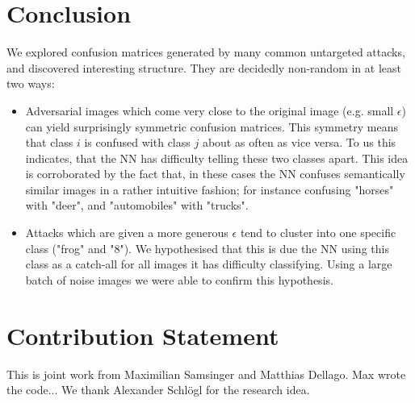 \documentclass{article}
\begin{document}
\section{Conclusion}
We explored confusion matrices generated by many common untargeted attacks, and discovered interesting structure.
They are decidedly non-random in at least two ways:
\begin{itemize}
	\item Adversarial images which come very close to the original image (e.g. small $\epsilon$) can yield surprisingly symmetric confusion matrices. This symmetry means that class $i$ is confused with class $j$ about as often as vice versa. To us this indicates, that the NN has difficulty telling these two classes apart. This idea is corroborated by the fact that, in these cases the NN confuses semantically similar images in a rather intuitive fashion; for instance confusing "horses" with "deer", and "automobiles" with "trucks".
	
	\item Attacks which are given a more generous $\epsilon$ tend to cluster into one specific class ("frog" and "8"). We hypothesised that this is due the NN using this class as a catch-all for all images it has difficulty classifying. Using a large batch of noise images we were able to confirm this hypothesis.
\end{itemize}

\section{Contribution Statement}

This is joint work from Maximilian Samsinger and Matthias Dellago. Max wrote the code... %
We thank Alexander Schlögl for the research idea.


\end{document}
